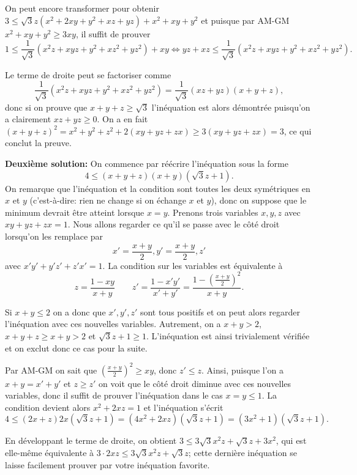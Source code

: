 \documentclass[language=german,style=solution]{smo}
\begin{document}
\begin{enumerate}[label=\textbf{\arabic*.}]
On peut encore transformer pour obtenir $3 \leq \sqrt{3}z(x^2 + 2xy + y^2 + xz + yz) + x^2 + xy + y^2$ et puisque par AM-GM $x^2 + xy + y^2 \geq 3xy$, il suffit de prouver
\[
	1 \leq \frac{1}{\sqrt{3}}(x^2z + xyz + y^2 + xz^2 + yz^2) + xy \Leftrightarrow yz + xz \leq \frac{1}{\sqrt{3}}(x^2z + xyz + y^2 + xz^2 + yz^2).
\]

Le terme de droite peut se factoriser comme
\[
	\frac{1}{\sqrt{3}}(x^2z + xyz + y^2 + xz^2 + yz^2) = \frac{1}{\sqrt{3}}(xz + yz)(x + y + z),
\]
donc si on prouve que $x + y + z \geq \sqrt{3}$ l'inéquation est alors démontrée puisqu'on a clairement $xz + yz \geq 0$. On a en fait $(x + y + z)^2 = x^2 + y^2 + z^2 + 2(xy + yz + zx) \geq 3(xy + yz + zx) = 3$, ce qui conclut la preuve.

\textbf{Deuxième solution:}
On commence par réécrire l'inéquation sous la forme
\[
	4 \leq (x+y+z)(x+y)(\sqrt{3}z + 1).
\]
On remarque que l'inéquation et la condition sont toutes les deux symétriques en $x$ et $y$ (c'est-à-dire: rien ne change si on échange $x$ et $y$), donc on suppose que le minimum devrait être atteint lorsque $x = y$. Prenons trois variables $x, y, z$ avec $xy +yz + zx = 1$. Nous allons regarder ce qu'il se passe avec le côté droit lorsqu'on les remplace par 
\[
	x' = \frac{x+y}{2}, y' = \frac{x+y}{2}, z'
\]
avec $x'y' + y'z' + z'x' = 1$. La condition sur les variables est équivalente à
\[
	z= \frac{1-xy}{x+y} \qquad z' = \frac{1-x'y'}{x'+y'} = \frac{1-\left(\frac{x+y}{2}\right)^2}{x+y}.
\]

Si $x + y \leq 2$ on a donc que $x', y', z'$ sont tous positifs et on peut alors regarder l'inéquation avec ces nouvelles variables. Autrement, on a $x+y > 2$, $x + y + z \geq x + y >2$ et $\sqrt{3}z + 1 \geq 1$. L'inéquation est ainsi trivialement vérifiée et on exclut donc ce cas pour la suite.

Par AM-GM on sait que $\left(\frac{x+y}{2}\right)^2 \geq xy$, donc $z' \leq z$. Ainsi, puisque l'on a $x+y = x' + y'$ et $z \geq z'$ on voit que le côté droit diminue avec ces nouvelles variables, donc il suffit de prouver l'inéquation dans le cas $x = y \leq 1$. La condition devient alors $x^2 + 2xz = 1$ et l'inéquation s'écrit
\[
	4 \leq (2x + z)2x(\sqrt{3}z + 1) = (4x^2 + 2xz)(\sqrt{3}z + 1) = (3x^2 + 1)(\sqrt{3}z + 1).
\]

En développant le terme de droite, on obtient $3\leq 3\sqrt{3}x^2z + \sqrt{3}z + 3x^2$, qui est elle-même équivalente à $3\cdot 2xz \leq 3\sqrt{3}x^2z + \sqrt{3}z$; cette dernière inéquation se laisse facilement prouver par votre inéquation favorite.


\end{enumerate}
\end{document}

